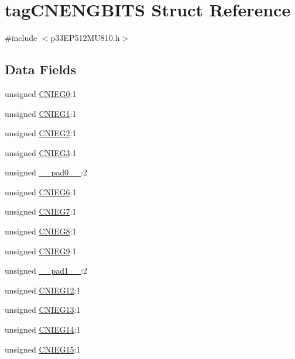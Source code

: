 \hypertarget{structtag_c_n_e_n_g_b_i_t_s}{}\section{tag\+C\+N\+E\+N\+G\+B\+I\+TS Struct Reference}
\label{structtag_c_n_e_n_g_b_i_t_s}


{\ttfamily \#include $<$p33\+E\+P512\+M\+U810.\+h$>$}

\subsection*{Data Fields}
\begin{DoxyCompactItemize}
\item 
unsigned \hyperlink{structtag_c_n_e_n_g_b_i_t_s_ad5f02a7cb2b7b2b055735951090ec6d1}{C\+N\+I\+E\+G0}\+:1
\item 
unsigned \hyperlink{structtag_c_n_e_n_g_b_i_t_s_ab01db81698de37e202de146277b73113}{C\+N\+I\+E\+G1}\+:1
\item 
unsigned \hyperlink{structtag_c_n_e_n_g_b_i_t_s_aceda16d9881a400ac7fa129c3ffd8baf}{C\+N\+I\+E\+G2}\+:1
\item 
unsigned \hyperlink{structtag_c_n_e_n_g_b_i_t_s_ade1661d32198816eca0e9b27f2be4302}{C\+N\+I\+E\+G3}\+:1
\item 
unsigned \hyperlink{structtag_c_n_e_n_g_b_i_t_s_adf71f3d8410c1f1dbbc96680a92c49af}{\+\_\+\+\_\+pad0\+\_\+\+\_\+}\+:2
\item 
unsigned \hyperlink{structtag_c_n_e_n_g_b_i_t_s_ac3154240f38105a34f35486bcce1569e}{C\+N\+I\+E\+G6}\+:1
\item 
unsigned \hyperlink{structtag_c_n_e_n_g_b_i_t_s_afd30843af340e437881eb23baf949675}{C\+N\+I\+E\+G7}\+:1
\item 
unsigned \hyperlink{structtag_c_n_e_n_g_b_i_t_s_aa1505f11d32b2c52521c7798277a212d}{C\+N\+I\+E\+G8}\+:1
\item 
unsigned \hyperlink{structtag_c_n_e_n_g_b_i_t_s_a464cb610b0f3eda5252047a358616014}{C\+N\+I\+E\+G9}\+:1
\item 
unsigned \hyperlink{structtag_c_n_e_n_g_b_i_t_s_acaf2d0924a107ec6e8d2e31febaf66f9}{\+\_\+\+\_\+pad1\+\_\+\+\_\+}\+:2
\item 
unsigned \hyperlink{structtag_c_n_e_n_g_b_i_t_s_adebbaa1457db3a52071615c45443d64e}{C\+N\+I\+E\+G12}\+:1
\item 
unsigned \hyperlink{structtag_c_n_e_n_g_b_i_t_s_a975fde8394e8ff74582c44b68995a535}{C\+N\+I\+E\+G13}\+:1
\item 
unsigned \hyperlink{structtag_c_n_e_n_g_b_i_t_s_a0d8c16f6a5b9ebff8f907e1513406410}{C\+N\+I\+E\+G14}\+:1
\item 
unsigned \hyperlink{structtag_c_n_e_n_g_b_i_t_s_a4e8ff8ca0036737cc7e7c1c4a162bf20}{C\+N\+I\+E\+G15}\+:1
\end{DoxyCompactItemize}


